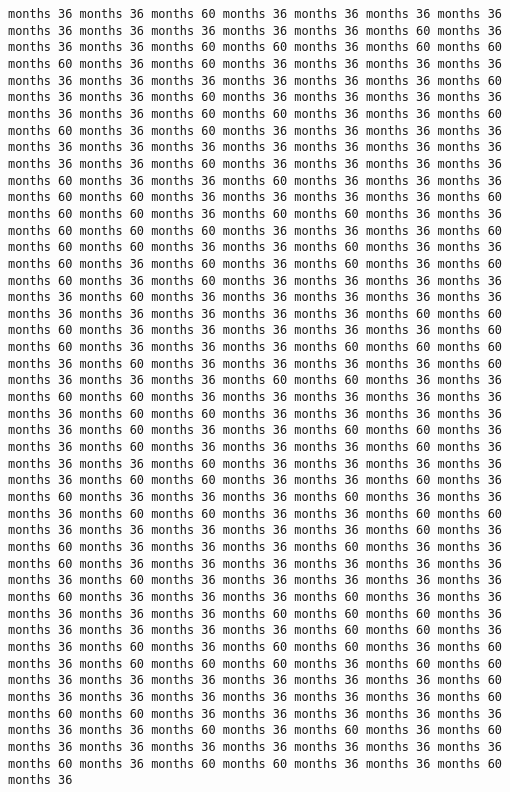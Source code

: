 \documentclass[11pt]{article}
\begin{document}
\begin{Verbatim}[commandchars=\\\{\}, frame=single, framerule=2mm, rulecolor=\color{outerrorbackground}]
months 36 months 36 months 60 months 36 months 36 months 36 months 36 months 36 months 36 months 36 months 36 months 36 months 60 months 36 months 36 months 36 months 60 months 60 months 36 months 60 months 60 months 60 months 36 months 60 months 36 months 36 months 36 months 36 months 36 months 36 months 36 months 36 months 36 months 36 months 60 months 36 months 36 months 60 months 36 months 36 months 36 months 36 months 36 months 36 months 60 months 60 months 36 months 36 months 60 months 60 months 36 months 60 months 36 months 36 months 36 months 36 months 36 months 36 months 36 months 36 months 36 months 36 months 36 months 36 months 36 months 60 months 36 months 36 months 36 months 36 months 60 months 36 months 36 months 60 months 36 months 36 months 36 months 60 months 60 months 36 months 36 months 36 months 36 months 60 months 60 months 60 months 36 months 60 months 60 months 36 months 36 months 60 months 60 months 60 months 36 months 36 months 36 months 60 months 60 months 60 months 36 months 36 months 60 months 36 months 36 months 60 months 36 months 60 months 36 months 60 months 36 months 60 months 60 months 36 months 60 months 36 months 36 months 36 months 36 months 36 months 60 months 36 months 36 months 36 months 36 months 36 months 36 months 36 months 36 months 36 months 36 months 60 months 60 months 60 months 36 months 36 months 36 months 36 months 36 months 60 months 60 months 36 months 36 months 36 months 60 months 60 months 60 months 36 months 60 months 36 months 36 months 36 months 36 months 60 months 36 months 36 months 36 months 60 months 60 months 36 months 36 months 60 months 60 months 36 months 36 months 36 months 36 months 36 months 36 months 60 months 60 months 36 months 36 months 36 months 36 months 36 months 60 months 36 months 36 months 60 months 60 months 36 months 36 months 60 months 36 months 36 months 36 months 60 months 36 months 36 months 36 months 60 months 36 months 36 months 36 months 36 months 36 months 60 months 60 months 36 months 36 months 60 months 36 months 60 months 36 months 36 months 36 months 60 months 36 months 36 months 36 months 60 months 60 months 36 months 36 months 60 months 60 months 36 months 36 months 36 months 36 months 36 months 60 months 36 months 60 months 36 months 36 months 36 months 60 months 36 months 36 months 60 months 36 months 36 months 36 months 36 months 36 months 36 months 36 months 60 months 36 months 36 months 36 months 36 months 36 months 60 months 36 months 36 months 36 months 60 months 36 months 36 months 36 months 36 months 36 months 60 months 60 months 60 months 36 months 36 months 36 months 36 months 36 months 60 months 60 months 36 months 36 months 60 months 36 months 60 months 60 months 36 months 60 months 36 months 60 months 60 months 60 months 36 months 60 months 60 months 36 months 36 months 36 months 36 months 36 months 36 months 60 months 36 months 36 months 36 months 36 months 36 months 36 months 60 months 60 months 60 months 36 months 36 months 36 months 36 months 36 months 36 months 36 months 60 months 36 months 60 months 36 months 60 months 36 months 36 months 36 months 36 months 36 months 36 months 36 months 60 months 36 months 60 months 60 months 36 months 36 months 60 months 36 
\end{Verbatim}
\end{document}
